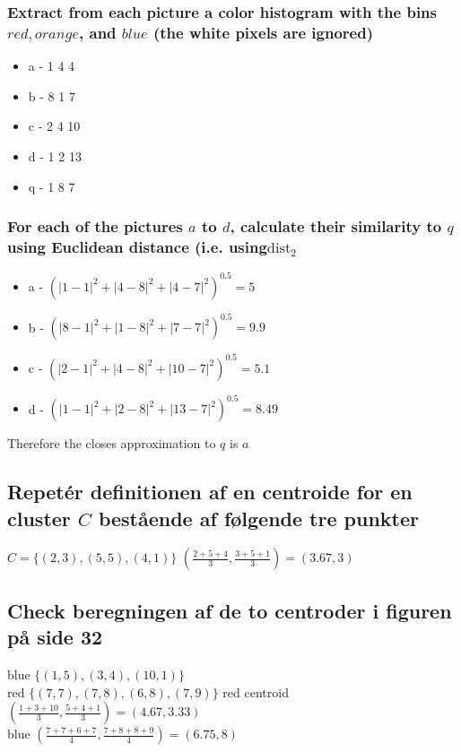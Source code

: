\documentclass[12pt, a4paper]{article}
\begin{document}
			\subsubsection{Extract from each picture a color histogram with the bins $red, orange$, and $blue$ (the white pixels are ignored)}
			\begin{itemize}
				\item a - 1 4 4\\
				\item b - 8 1 7\\
				\item c - 2 4 10\\
				\item d - 1 2 13\\
				\item q - 1 8 7
			\end{itemize}
			\subsubsection{For each of the pictures $a$ to $d$, calculate their similarity to $q$ using Euclidean distance (i.e. using$\text{dist}_2$}
			\begin{itemize}
				\item a - $(|1-1|^2+|4-8|^2+|4-7|^2)^{0.5}=5$
				\item b - $(|8-1|^2+|1-8|^2+|7-7|^2)^{0.5}=9.9$
				\item c - $(|2-1|^2+|4-8|^2+|10-7|^2)^{0.5}=5.1$
				\item d - $(|1-1|^2+|2-8|^2+|13-7|^2)^{0.5}=8.49$
			\end{itemize}
			Therefore the closes approximation to $q$ is $a$
		\subsection{Repetér definitionen af en centroide for en cluster $C$ bestående af følgende tre punkter}
			$C=\{(2,3),(5,5),(4,1)\}$
			$(\frac{2+5+4}{3},\frac{3+5+1}{3})=(3.67,3)$
		\subsection{Check beregningen af de to centroder i figuren på side 32}
			blue $\{(1,5),(3,4),(10,1)\}$\\
			red $\{(7,7),(7,8),(6,8),(7,9)\}$
			red centroid $(\frac{1+3+10}{3},\frac{5+4+1}{3})=(4.67,3.33)$\\
			blue $(\frac{7+7+6+7}{4},\frac{7+8+8+9}{4})=(6.75,8)$
\end{document}
